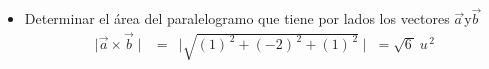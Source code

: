 \begin{itemize}
{\begin{eqnarray*}
\vec{a} \times \vec{b} &=& (1,\,-2,\,1) \\
||\,\vec{a} \times \vec{b}\,|| &=& \sqrt{(1)^{\,2} + (-2)^{\,2} + (1)^{\,2}\,} \\
||\,\vec{a} \times \vec{b}\,|| &=& \sqrt{1 + 4 + 1\,} = \sqrt{6\,} \\
\vec{u}^{\,\perp} &=& \dfrac{\vec{a} \times \vec{b}}{||\,\vec{a} \times \vec{b}\,||} = \dfrac{(1,\,-2,\,1)}{\sqrt{6}} \\
 \vec{u}^{\,\perp} &=& \Big(\dfrac{1}{\sqrt{6}}, \,\dfrac{-2}{\sqrt{6}}, \,\dfrac{1}{\sqrt{6}}\Big)
\end{eqnarray*}
}
\item{Determinar el área del paralelogramo que tiene por lados los vectores $\overrightarrow{a\,}$\;\;y\;\;$\overrightarrow{b\,}$
\begin{eqnarray*}
\mid\vec{a} \times \vec{b}\mid &=& \mid\sqrt{(1)^{\,2} + (-2)^{\,2} + (1)^{\,2}}\mid\;= \sqrt{6\,}\,u^{\,2}
\end{eqnarray*}
}
\end{itemize}

